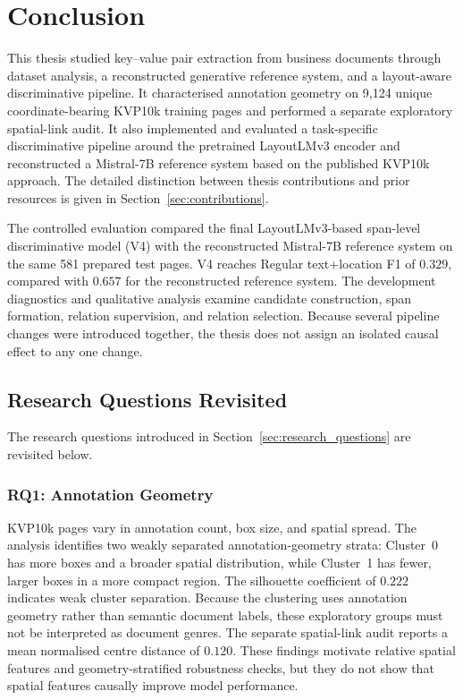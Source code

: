 \chapter{Conclusion}
\label{ch:conclusion}

This thesis studied key--value pair extraction from business documents through
dataset analysis, a reconstructed generative reference system, and a
layout-aware discriminative pipeline. It characterised annotation geometry on
9{,}124 unique coordinate-bearing KVP10k training pages and performed a
separate exploratory spatial-link audit. It also implemented and evaluated a
task-specific discriminative pipeline around the pretrained LayoutLMv3 encoder
and reconstructed a Mistral-7B reference system based on the published KVP10k
approach. The detailed distinction between thesis contributions and prior
resources is given in Section~\ref{sec:contributions}.

The controlled evaluation compared the final LayoutLMv3-based span-level
discriminative model (V4) with the reconstructed Mistral-7B reference system on
the same 581 prepared test pages. V4 reaches Regular text+location F1 of
$0.329$, compared with $0.657$ for the reconstructed reference system. The
development diagnostics and qualitative analysis examine candidate
construction, span formation, relation supervision, and relation selection.
Because several pipeline changes were introduced together, the thesis does not
assign an isolated causal effect to any one change.

\section{Research Questions Revisited}
\label{sec:rq_revisited}

The research questions introduced in Section~\ref{sec:research_questions} are
revisited below.

\subsection{RQ1: Annotation Geometry}

KVP10k pages vary in annotation count, box size, and spatial spread. The
analysis identifies two weakly separated annotation-geometry strata:
Cluster~0 has more boxes and a broader spatial distribution, while Cluster~1
has fewer, larger boxes in a more compact region. The silhouette coefficient
of $0.222$ indicates weak cluster separation. Because the clustering uses
annotation geometry rather than semantic document labels, these exploratory
groups must not be interpreted as document genres. The separate spatial-link
audit reports a mean normalised
centre distance of $0.120$. These findings motivate relative spatial features
and geometry-stratified robustness checks, but they do not show that spatial
features causally improve model performance.

